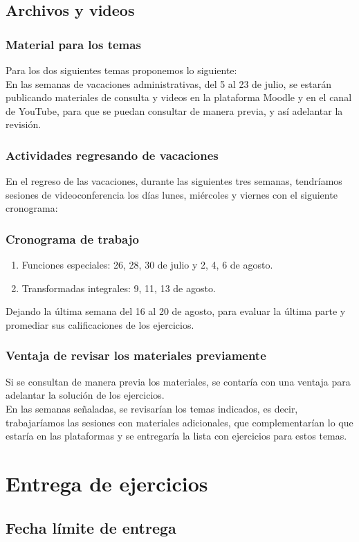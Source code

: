 \documentclass[12pt]{beamer}
\begin{document}
\subsection{Archivos y videos}

\begin{frame}
\frametitle{Material para los temas}
Para los dos siguientes temas proponemos lo siguiente:
\\
\bigskip
\pause
En las semanas de vacaciones administrativas, del 5 al 23 de julio, se estarán publicando materiales de consulta y videos en la plataforma Moodle y en el canal de YouTube, para que se puedan consultar de manera previa, y así adelantar la revisión.
\end{frame}
\begin{frame}
\frametitle{Actividades regresando de vacaciones}
En el regreso de las vacaciones, durante las siguientes tres semanas, tendríamos sesiones de videoconferencia los días lunes, miércoles y viernes con el siguiente cronograma:
\end{frame}
\begin{frame}
\frametitle{Cronograma de trabajo}
\begin{enumerate}
\item Funciones especiales: 26, 28, 30 de julio y 2, 4, 6 de agosto.
\item Transformadas integrales: 9, 11, 13 de agosto.
\end{enumerate}
\pause
Dejando la última semana del 16 al 20 de agosto, para evaluar la última parte y promediar sus calificaciones de los ejercicios.
\end{frame}
\begin{frame}
\frametitle{Ventaja de revisar los materiales previamente}
Si se consultan de manera previa los materiales, se contaría con una ventaja para adelantar la solución de los ejercicios.
\\
\bigskip
\pause
En las semanas señaladas, se revisarían los temas indicados, es decir, trabajaríamos las sesiones con materiales adicionales, que complementarían lo que estaría en las plataformas y se entregaría la lista con ejercicios para estos temas.
\end{frame}

\section{Entrega de ejercicios}
\subsection{Fecha límite de entrega}
\end{document}
